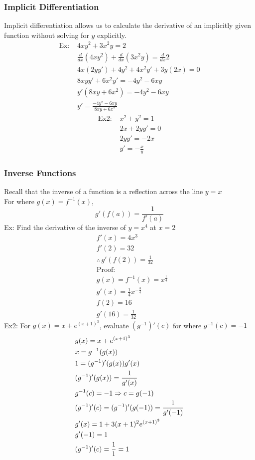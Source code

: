 \documentclass[11pt, fleqn]{article}
\begin{document}
\subsubsection{Implicit Differentiation}
Implicit differentiation allows us to calculate the derivative of an implicitly given function without solving for $y$ explicitly.
\begin{align*}
    \text{Ex: }&4xy^2+3x^2y=2\\
    &\frac{d}{dx}(4xy^2)+\frac{d}{dx}(3x^2y)=\frac{d}{dx}2\\
    &4x(2yy')+4y^2+4x^2y'+3y(2x)=0\\
    &8xyy'+6x^2y'=-4y^2-6xy\\
    &y'(8xy+6x^2)=-4y^2-6xy\\
    &y'=\frac{-4y^2-6xy}{8xy+6x^2}
\end{align*}
\begin{align*}
    \text{Ex2: }&x^2+y^2=1\\
    &2x+2yy'=0\\
    &2yy'=-2x\\
    &y'=-\frac{x}{y}
\end{align*}

\subsubsection{Inverse Functions}
Recall that the inverse of a function is a reflection across the line $y=x$\\
For where $g(x)=f^{-1}(x)$,
$$g'(f(a))=\frac{1}{f'(a)}$$
Ex: Find the derivative of the inverse of $y=x^4$ at $x=2$
\begin{align*}
    &f'(x)=4x^3\\
    &f'(2)=32\\
    &\therefore\,g'(f(2))=\frac{1}{32}\\
    &\text{Proof:}\\
    &g(x)=f^{-1}(x)=x^{\frac{1}{4}}\\
    &g'(x)=\frac{1}{4}x^{-\frac{3}{4}}\\
    &f(2)=16\\
    &g'(16)=\frac{1}{32}
\end{align*}
Ex2: For $g(x)=x+e^{(x+1)^3}$, evaluate $(g^{-1})'(c)$ for where $g^{-1}(c)=-1$
\begin{align*}
    &g(x)=x+e^{(x+1)^3}\\
    &x=g^{-1}(g(x))\\
    &1=(g^{-1})'(g(x))g'(x)\\
    &(g^{-1})'(g(x))=\frac{1}{g'(x)}\\
    &g^{-1}(c)=-1\Rightarrow c=g(-1)\\
    &(g^{-1})'(c)=(g^{-1})'(g(-1))=\frac{1}{g'(-1)}\\
    &g'(x)=1+3(x+1)^2e^{(x+1)^3}\\
    &g'(-1)=1\\
    &(g^{-1})'(c)=\frac{1}{1}=1
\end{align*}
\end{document}

